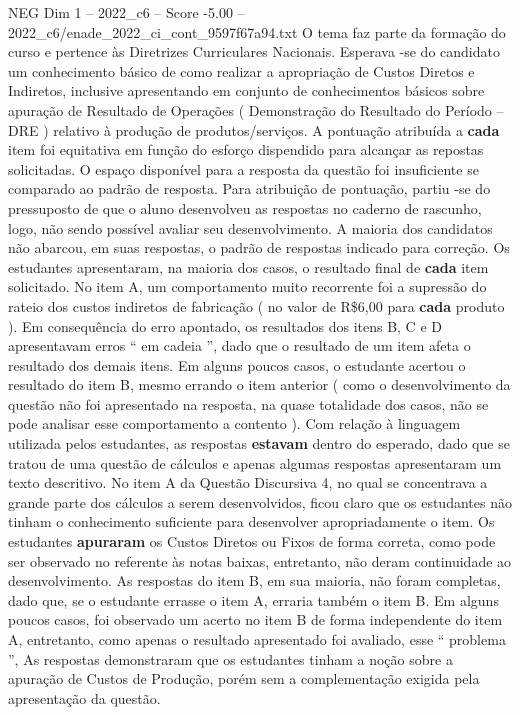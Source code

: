 \begin{textsample}{NEG Dim 1 – 2022\_c6 – Score -5.00 – 2022\_c6/enade\_2022\_ci\_cont\_9597f67a94.txt}
O tema faz parte da formação do curso e pertence às Diretrizes Curriculares Nacionais.
Esperava -se do candidato um conhecimento básico de como realizar a apropriação de Custos Diretos e Indiretos, inclusive apresentando em conjunto de conhecimentos básicos sobre apuração de Resultado de Operações ( Demonstração do Resultado do Período – DRE ) relativo à produção de produtos/serviços.
A pontuação atribuída a \textbf{cada} item foi equitativa em função do esforço dispendido para alcançar as repostas solicitadas.
O espaço disponível para a resposta da questão foi insuficiente se comparado ao padrão de resposta.
Para atribuição de pontuação, partiu -se do pressuposto de que o aluno desenvolveu as respostas no caderno de rascunho, logo, não sendo possível avaliar seu desenvolvimento.
A maioria dos candidatos não abarcou, em suas respostas, o padrão de respostas indicado para correção.
Os estudantes apresentaram, na maioria dos casos, o resultado final de \textbf{cada} item solicitado.
No item A, um comportamento muito recorrente foi a supressão do rateio dos custos indiretos de fabricação ( no valor de R\$6,00 para \textbf{cada} produto ).
Em consequência do erro apontado, os resultados dos itens B, C e D apresentavam erros “ em cadeia ”, dado que o resultado de um item afeta o resultado dos demais itens.
Em alguns poucos casos, o estudante acertou o resultado do item B, mesmo errando o item anterior ( como o desenvolvimento da questão não foi apresentado na resposta, na quase totalidade dos casos, não se pode analisar esse comportamento a contento ).
Com relação à linguagem utilizada pelos estudantes, as respostas \textbf{estavam} dentro do esperado, dado que se tratou de uma questão de cálculos e apenas algumas respostas apresentaram um texto descritivo.
No item A da Questão Discursiva 4, no qual se concentrava a grande parte dos cálculos a serem desenvolvidos, ficou claro que os estudantes não tinham o conhecimento suficiente para desenvolver apropriadamente o item.
Os estudantes \textbf{apuraram} os Custos Diretos ou Fixos de forma correta, como pode ser observado no referente às notas baixas, entretanto, não deram continuidade ao desenvolvimento.
As respostas do item B, em sua maioria, não foram completas, dado que, se o estudante errasse o item A, erraria também o item B.
Em alguns poucos casos, foi observado um acerto no item B de forma independente do item A, entretanto, como apenas o resultado apresentado foi avaliado, esse “ problema ”, As respostas demonstraram que os estudantes tinham a noção sobre a apuração de Custos de Produção, porém sem a complementação exigida pela apresentação da questão.

\end{textsample}
